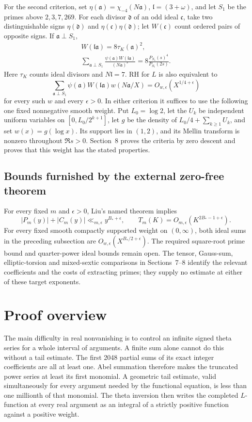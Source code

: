 \documentclass[11pt]{article}
\begin{document}
For the second criterion, set
$\eta(\mathfrak a)=\chi_{-4}(N\mathfrak a)$,
$\mathfrak l=(3+\omega)$, and let $S_1$ be the primes above
$2,3,7,269$. For each divisor $\mathfrak d$ of an odd ideal
$\mathfrak c$, take two distinguishable signs
$\eta(\mathfrak d)$ and
$\eta(\mathfrak c)\eta(\mathfrak d)$; let $W(\mathfrak c)$
count ordered pairs of opposite signs. If $\mathfrak a\perp S_1$,
\[
 \begin{gathered}
 W(\mathfrak l\mathfrak a)=8\tau_K(\mathfrak a)^2,\\
 \sum_{\mathfrak a\perp S_1}
   \frac{\psi(\mathfrak a)W(\mathfrak l\mathfrak a)}{(N\mathfrak a)^s}
       =8\frac{P_{S_1}(s)^4}{P_{S_1}(2s)}.
 \end{gathered}
\]
Here $\tau_K$ counts ideal divisors and $N\mathfrak l=7$.
RH for $L$ is also equivalent to
\[
 \sum_{\mathfrak a\perp S_1}\psi(\mathfrak a)W(\mathfrak l\mathfrak a)
       w(N\mathfrak a/X)=O_{w,\epsilon}(X^{1/4+\epsilon})
\]
for every such $w$ and every $\epsilon>0$.
In either criterion it suffices to use the following one fixed
nonnegative smooth weight. Put $L_0=\log2$, let the $U_k$ be
independent uniform variables on $[0,L_0/2^{k+1}]$, let $g$ be the
density of $L_0/4+\sum_{k\ge1}U_k$, and set $w(x)=g(\log x)$.
Its support lies in $(1,2)$, and its Mellin transform is nonzero
throughout $\Re s>0$. Section~8 proves the criteria by zero descent
and proves that this weight has the stated properties.

\subsection*{Bounds furnished by the external zero-free theorem}
For every fixed $m$ and $\epsilon>0$, Liu's named theorem implies
\[
 |P_m(y)|+|C_m(y)|\ll_{m,\epsilon}y^{B_*+\epsilon},\qquad
 T_m(K)=O_{m,\epsilon}(K^{2B_*-1+\epsilon}).
\]
For every fixed smooth compactly supported weight on $(0,\infty)$,
both ideal sums in the preceding subsection are
$O_{w,\epsilon}(X^{B_*/2+\epsilon})$.
The required square-root prime bound and quarter-power ideal bounds
remain open. The tensor, Gauss-sum, elliptic-torsion and mixed-sextic
comparisons in Sections~7--8 identify the relevant coefficients and
the costs of extracting primes; they supply no estimate at either
of these target exponents.

\section{Proof overview}
The main difficulty in real nonvanishing is to control an infinite signed theta series for a whole interval of arguments. A finite sum alone cannot do this without a tail estimate. The first 2048 partial sums of its exact integer coefficients are all at least one. Abel summation therefore makes the truncated power series at least its first monomial. A geometric tail estimate, valid simultaneously for every argument needed by the functional equation, is less than one millionth of that monomial. The theta inversion then writes the completed $L$-function at every real argument as an integral of a strictly positive function against a positive weight.
\end{document}
